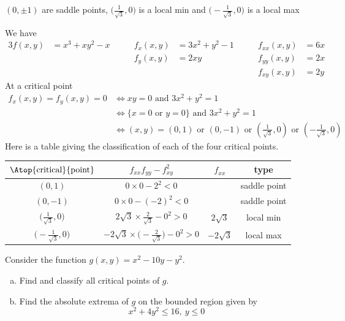 \begin{answer}
$(0,\pm 1)$ are saddle points,
$\big(\frac{1}{\sqrt{3}},0\big)$ is a local min and
$\big(-\frac{1}{\sqrt{3}},0\big)$ is a local max
\end{answer}

\begin{solution}
We have
\begin{alignat*}{3}
f(x,y)&=x^3+xy^2-x\qquad &
f_x(x,y)&=3x^2+y^2-1\qquad &
f_{xx}(x,y)&=6x \\
 & & f_y(x,y)&=2xy &
f_{yy}(x,y)&=2x \\
 & & & & f_{xy}(x,y)&=2y
\end{alignat*}
At a critical point
\begin{align*}
f_x(x,y)=f_y(x,y)=0
&\iff xy=0\text{ and }3x^2+y^2=1 \\
&\iff \{x=0\text{ or }y=0\}\text{ and }3x^2+y^2=1 \\
&\iff (x,y)=(0,1)\text{ or }(0,-1)\text{ or }\left(\frac{1}{\sqrt{3}},0\right)
\text{ or }\left(-\frac{1}{\sqrt{3}},0\right)
\end{align*}
Here is a table giving the classification of each of the four critical
points.
\begin{center}
\renewcommand{\arraystretch}{1.3}
     \begin{tabular}{|c|c|c|c|}
     \hline
    $\Atop{\text{critical}}{\text{point}}$  & $f_{xx}f_{yy}-f_{xy}^2$ & 
                                                          $f_{xx}$ & type \\    
    \hline
     $(0,1)$   & $0\times 0-2^2<0$      &    & saddle point \\ \hline
     $(0,-1)$  & $0\times 0-(-2)^2<0$   &    & saddle point \\  \hline
     $\big(\frac{1}{\sqrt{3}},0\big)$  &
           $2\sqrt{3}\times\frac{2}{\sqrt{3}}-0^2>0$ & $2\sqrt{3}$ & 
                                                     local min\\  \hline
     $\big(-\frac{1}{\sqrt{3}},0\big)$ & 
          $-2\sqrt{3}\times \big(-\frac{2}{\sqrt{3}}\big)-0^2>0$ &                                         $-2\sqrt{3}$ & local max \\ \hline
     \end{tabular}
\renewcommand{\arraystretch}{1.0}
\end{center}
\end{solution}

\begin{question} [M200 2001A] %
Consider the function 
$
g(x,y)=x^2-10y-y^2
.$ 
\begin{enumerate}[(a)]
\item
Find and classify  all critical points of $g$.

\item 
Find the absolute extrema of $g$ on the bounded region given by
\begin{equation*}
x^2+4y^2\le 16,\ y\le 0
\end{equation*}
\end{enumerate}
\end{question}


